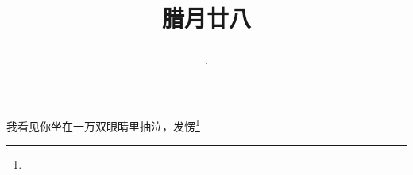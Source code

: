 \title{\date[d=7,m=2,y=2024][year:cn-y,年,month:cn,day:cn,日,·,weekday]·腊月廿八 }
我看见你坐在一万双眼睛里抽泣，发愣\footnote{ }

